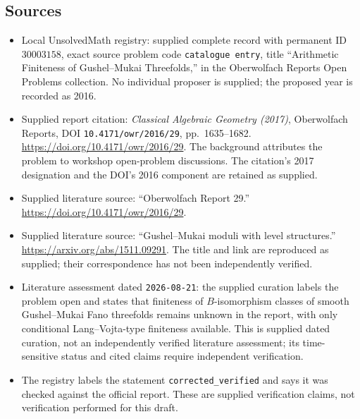 \documentclass[11pt]{article}
\begin{document}
\subsection{Sources}
\begin{itemize}
\item Local UnsolvedMath registry: supplied complete record with permanent ID \(30003158\), exact source problem code \texttt{catalogue entry}, title ``Arithmetic Finiteness of Gushel--Mukai Threefolds,'' in the Oberwolfach Reports Open Problems collection. No individual proposer is supplied; the proposed year is recorded as 2016.
\item Supplied report citation: \emph{Classical Algebraic Geometry (2017)}, Oberwolfach Reports, DOI \texttt{10.4171/owr/2016/29}, pp.\ 1635--1682. \url{https://doi.org/10.4171/owr/2016/29}. The background attributes the problem to workshop open-problem discussions. The citation's 2017 designation and the DOI's 2016 component are retained as supplied.
\item Supplied literature source: ``Oberwolfach Report 29.'' \url{https://doi.org/10.4171/owr/2016/29}.
\item Supplied literature source: ``Gushel--Mukai moduli with level structures.'' \url{https://arxiv.org/abs/1511.09291}. The title and link are reproduced as supplied; their correspondence has not been independently verified.
\item Literature assessment dated \texttt{2026-08-21}: the supplied curation labels the problem open and states that finiteness of \(B\)-isomorphism classes of smooth Gushel--Mukai Fano threefolds remains unknown in the report, with only conditional Lang--Vojta-type finiteness available. This is supplied dated curation, not an independently verified literature assessment; its time-sensitive status and cited claims require independent verification.
\item The registry labels the statement \texttt{corrected\_verified} and says it was checked against the official report. These are supplied verification claims, not verification performed for this draft.
\end{itemize}
\end{document}
